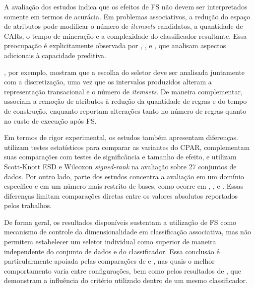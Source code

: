 A avaliação dos estudos indica que os efeitos de FS não devem ser interpretados
somente em termos de acurácia. Em problemas associativos, a redução do espaço de
atributos pode modificar o número de \textit{itemsets} candidatos, a quantidade
de CARs, o tempo de mineração e a complexidade do classificador resultante.
Essa preocupação é explicitamente observada por
,
,
 e
, que analisam aspectos adicionais à capacidade
preditiva.

, por exemplo, mostram que a escolha do
seletor deve ser analisada juntamente com a discretização, uma vez que os
intervalos produzidos alteram a representação transacional e o número de
\textit{itemsets}. De maneira complementar,
 associam a remoção de atributos à redução da
quantidade de regras e do tempo de construção, enquanto
 reportam alterações tanto no número de regras
quanto no custo de execução após FS.

Em termos de rigor experimental, os estudos também apresentam diferenças.
 utilizam testes estatísticos para comparar
as variantes do CPAR,  complementam suas
comparações com testes de significância e tamanho de efeito, e
 utilizam Scott-Knott ESD e Wilcoxon
\textit{signed-rank} na avaliação sobre 27 conjuntos de dados. Por outro lado,
parte dos estudos concentra a avaliação em um domínio específico e em um número
mais restrito de bases, como ocorre em
,
,
 e
. Essas diferenças limitam comparações diretas
entre os valores absolutos reportados pelos trabalhos.

De forma geral, os resultados disponíveis sustentam a utilização de FS como
mecanismo de controle da dimensionalidade em classificação associativa, mas não
permitem estabelecer um seletor individual como superior de maneira
independente do conjunto de dados e do classificador. Essa conclusão é
particularmente apoiada pelas comparações de
 e
, nas quais o melhor comportamento varia entre
configurações, bem como pelos resultados de
, que demonstram a influência do critério
utilizado dentro de um mesmo classificador.

